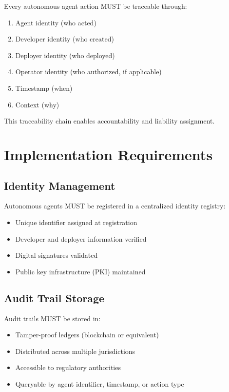 \begin{articlebox}
Every autonomous agent action MUST be traceable through:
\begin{enumerate}
    \item Agent identity (who acted)
    \item Developer identity (who created)
    \item Deployer identity (who deployed)
    \item Operator identity (who authorized, if applicable)
    \item Timestamp (when)
    \item Context (why)
\end{enumerate}

This traceability chain enables accountability and liability assignment.
\end{articlebox}

\vspace{0.5cm}

\section{Implementation Requirements}

\subsection{Identity Management}

Autonomous agents MUST be registered in a centralized identity registry:

\begin{itemize}
    \item Unique identifier assigned at registration
    \item Developer and deployer information verified
    \item Digital signatures validated
    \item Public key infrastructure (PKI) maintained
\end{itemize}

\subsection{Audit Trail Storage}

Audit trails MUST be stored in:

\begin{itemize}
    \item Tamper-proof ledgers (blockchain or equivalent)
    \item Distributed across multiple jurisdictions
    \item Accessible to regulatory authorities
    \item Queryable by agent identifier, timestamp, or action type
\end{itemize}

